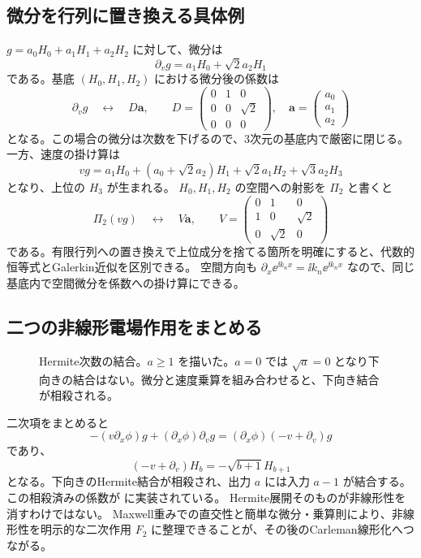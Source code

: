 \subsection{微分を行列に置き換える具体例}
$g=a_0H_0+a_1H_1+a_2H_2$ に対して、微分は
\[
\partial_vg=a_1H_0+\sqrt2a_2H_1
\]
である。基底 $(H_0,H_1,H_2)$ における微分後の係数は
\[
\partial_vg\quad\longleftrightarrow\quad
D\bm a,
\qquad D=\begin{pmatrix}0&1&0\\0&0&\sqrt2\\0&0&0\end{pmatrix},
\quad\bm a=\begin{pmatrix}a_0\\a_1\\a_2\end{pmatrix}
\]
となる。この場合の微分は次数を下げるので、3次元の基底内で厳密に閉じる。
一方、速度の掛け算は
\[
vg=a_1H_0+(a_0+\sqrt2a_2)H_1+\sqrt2a_1H_2+\sqrt3a_2H_3
\]
となり、上位の $H_3$ が生まれる。
$H_0,H_1,H_2$ の空間への射影を $\Pi_2$ と書くと
\[
\Pi_2(vg)\quad\longleftrightarrow\quad
V\bm a,\qquad
V=\begin{pmatrix}0&1&0\\1&0&\sqrt2\\0&\sqrt2&0\end{pmatrix}
\]
である。有限行列への置き換えで上位成分を捨てる箇所を明確にすると、代数的恒等式とGalerkin近似を区別できる。
空間方向も $\partial_x\ee^{\ii k_nx}=\ii k_n\ee^{\ii k_nx}$ なので、同じ基底内で空間微分を係数への掛け算にできる。

\subsection{二つの非線形電場作用をまとめる}
\begin{figure}[htbp]
\centering

\caption{Hermite次数の結合。$a\geq1$ を描いた。$a=0$ では $\sqrt a=0$ となり下向きの結合はない。微分と速度乗算を組み合わせると、下向き結合が相殺される。}
\label{fig:hermite-coupling}
\end{figure}

二次項をまとめると
\[
-(v\partial_x\phi)g+(\partial_x\phi)\partial_vg
=(\partial_x\phi)(-v+\partial_v)g
\]
であり、
\begin{equation}
(-v+\partial_v)H_b=-\sqrt{b+1}H_{b+1}
\label{eq:hermitecancel}
\end{equation}
となる。下向きのHermite結合が相殺され、出力 $a$ には入力 $a-1$ が結合する。
この相殺済みの係数が  に実装されている。
Hermite展開そのものが非線形性を消すわけではない。
Maxwell重みでの直交性と簡単な微分・乗算則により、非線形性を明示的な二次作用 $F_2$ に整理できることが、その後のCarleman線形化へつながる。

